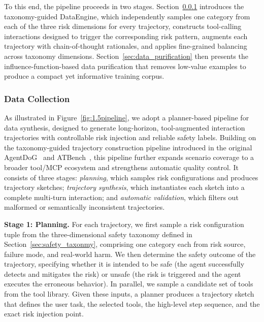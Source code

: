 \documentclass{llmxive}
\begin{document}
To this end, the pipeline proceeds in two stages. Section~\ref{sec:data_collection} introduces the taxonomy-guided DataEngine, which independently samples one category from each of the three risk dimensions for every trajectory, constructs tool-calling interactions designed to trigger the corresponding risk pattern, augments each trajectory with chain-of-thought rationales, and applies fine-grained balancing across taxonomy dimensions. Section~\ref{sec:data_purification} then presents the influence-function-based data purification that removes low-value examples to produce a compact yet informative training corpus.

\subsubsection{Data Collection}
\label{sec:data_collection}


As illustrated in Figure~\ref{fig:1.5pipeline}, we adopt a planner-based pipeline for data synthesis, designed to generate long-horizon, tool-augmented interaction trajectories with controllable risk injection and reliable safety labels. Building on the taxonomy-guided trajectory construction pipeline introduced in the original AgentDoG~\citep{liu2026agentdogdiagnosticguardrailframework} and ATBench~\citep{li2026atbench}, this pipeline further expands scenario coverage to a broader tool/MCP ecosystem and strengthens automatic quality control. It consists of three stages: \emph{planning}, which samples risk configurations and produces trajectory sketches; \emph{trajectory synthesis}, which instantiates each sketch into a complete multi-turn interaction; and \emph{automatic validation}, which filters out malformed or semantically inconsistent trajectories.


\textbf{Stage 1: Planning.}
For each trajectory, we first sample a risk configuration tuple from the three-dimensional safety taxonomy defined in Section~\ref{sec:safety_taxonmy}, comprising one category each from risk source, failure mode, and real-world harm. We then determine the safety outcome of the trajectory, specifying whether it is intended to be safe (the agent successfully detects and mitigates the risk) or unsafe (the risk is triggered and the agent executes the erroneous behavior). In parallel, we sample a candidate set of tools from the tool library. Given these inputs, a planner produces a trajectory sketch that defines the user task, the selected tools, the high-level step sequence, and the exact risk injection point.
\end{document}
